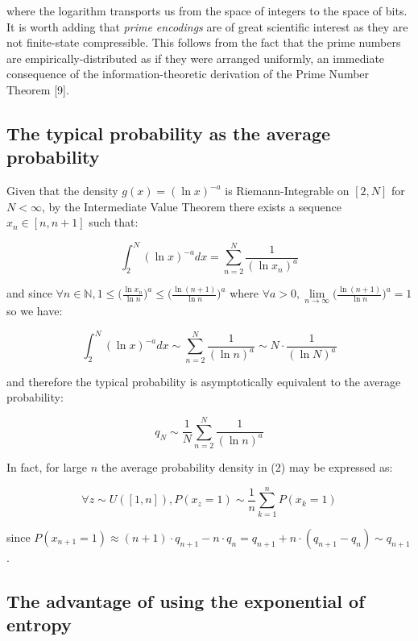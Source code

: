 \documentclass{article}
\begin{document}
where the logarithm transports us from the space of integers to the space of bits. It is worth adding that \textit{prime encodings} are of great scientific interest as they are not finite-state compressible. This follows from the fact that the prime numbers are empirically-distributed as if they were arranged uniformly, an immediate consequence of the information-theoretic derivation of the Prime Number Theorem [9]. 

\subsection{The typical probability as the average probability}

Given that the density $g(x) = (\ln x)^{-a}$ is Riemann-Integrable on $[2,N]$ for $N < \infty$, by the Intermediate Value Theorem there exists a sequence $x_n \in [n,n+1]$ such that: 

\begin{equation}
\int_{2}^N (\ln x)^{-a} dx = \sum_{n=2}^N \frac{1}{(\ln x_n)^a}
\end{equation}

and since $\forall n \in \mathbb{N}, 1 \leq \big(\frac{\ln x_n}{\ln n}\big)^a \leq \big(\frac{\ln (n+1)}{\ln n}\big)^a$ where $\forall a > 0, \lim\limits_{n \to \infty} \big(\frac{\ln (n+1)}{\ln n}\big)^a = 1$ so we have: 

\begin{equation}
\int_{2}^N (\ln x)^{-a} dx \sim \sum_{n=2}^N \frac{1}{(\ln n)^a} \sim N \cdot \frac{1}{(\ln N)^a}
\end{equation}

and therefore the typical probability is asymptotically equivalent to the 
average probability: 

\begin{equation}
q_N \sim \frac{1}{N} \sum_{n=2}^N \frac{1}{(\ln n)^a} 	
\end{equation}

In fact, for large $n$ the average probability density in (2) may be expressed as: 

\begin{equation}
\forall z \sim U([1,n]), P(x_z = 1) \sim \frac{1}{n} \sum_{k=1}^n P(x_k = 1)	\end{equation}

since $P(x_{n+1}=1) \approx (n+1) \cdot q_{n+1} - n \cdot q_n = q_{n+1} + n \cdot (q_{n+1}-q_n) \sim q_{n+1}$. 

\subsection{The advantage of using the exponential of entropy}
\end{document}
